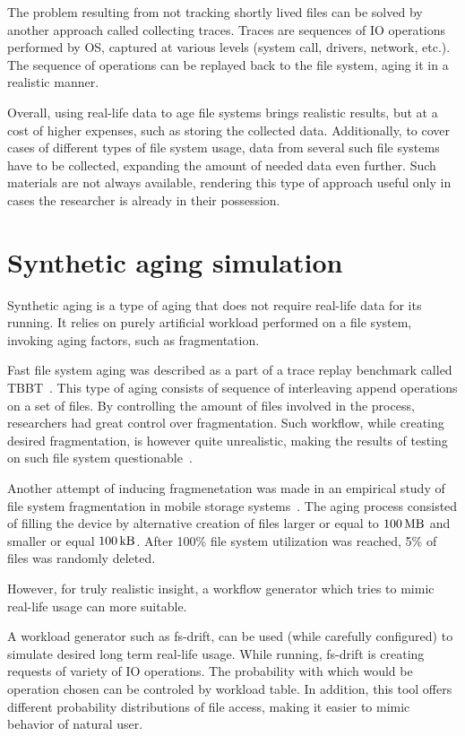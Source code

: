 \documentclass[
  color, %
  table, %
  lof,   %
  lot,   %
]{fithesis3}
\begin{document}
The problem resulting from not tracking shortly lived files can be solved by another approach called collecting traces. Traces are sequences of IO operations performed by OS, captured at various levels (system call, drivers, network, etc.). The sequence of operations can be replayed back to the file system, aging it in a realistic manner.

Overall, using real-life data to age file systems brings realistic results, but at a cost of higher expenses, such as storing the collected data. Additionally, to cover cases of different types of file system usage, data from several such file systems have to be collected, expanding the amount of needed data even further. Such materials are not always available, rendering this type of approach useful only in cases the researcher is already in their possession.

\section{Synthetic aging simulation}
Synthetic aging is a type of aging that does not require real-life data for its running. It relies on purely artificial workload performed on a file system, invoking aging factors, such as fragmentation.

Fast file system aging was described as a part of a trace replay benchmark called TBBT~\cite{Zhu:2005:TSA:1251028.1251052}. This type of aging consists of sequence of interleaving append operations on a set of files. By controlling the amount of files involved in the process, researchers had great control over fragmentation. Such workflow, while creating desired fragmentation, is however quite unrealistic, making the results of testing on such file system questionable~\cite{Traeger:2008:NYS:1367829.1367831}.

Another attempt of inducing fragmenetation was made in an empirical study of file system fragmentation in mobile storage systems~\cite{ji2016empirical}. The aging process consisted of filling the device by alternative creation of files larger or equal to $\SI{100}{\mega\byte}$ and smaller or equal $\SI{100}{\kilo\byte}$. After 100\% file system utilization was reached, 5\% of files was randomly deleted. 

However, for truly realistic insight, a workflow generator which tries to mimic real-life usage can more suitable.

A workload generator such as fs-drift\footnotemark[1], can be used (while carefully configured) to simulate desired long term real-life usage. While running, fs-drift is creating requests of variety of IO operations. The probability with which would be operation chosen can be controled by workload table. In addition, this tool offers different probability distributions of file access, making it easier to mimic behavior of natural user.%
\end{document}
